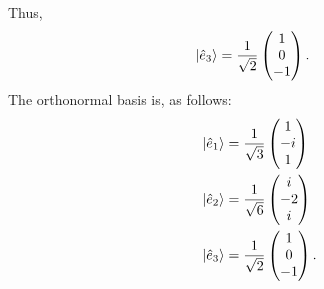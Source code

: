 \documentclass[10pt]{mypackage}
\begin{document}
\begin{example}
 Thus,
 \begin{align*}
   \ket{\hat{e}_3} &= \frac{1}{\sqrt{2}} \begin{pmatrix}1\\0\\-1\end{pmatrix}.
 \end{align*}
 The orthonormal basis is, as follows:
 \begin{align*}
   \ket{\hat{e}_1} &= \frac{1}{\sqrt{3}} \begin{pmatrix}1\\-i\\1\end{pmatrix}\\
   \ket{\hat{e}_2} &= \frac{1}{\sqrt{6}} \begin{pmatrix}i\\-2\\i\end{pmatrix}\\
   \ket{\hat{e}_3} &= \frac{1}{\sqrt{2}} \begin{pmatrix}1\\0\\-1\end{pmatrix}.
 \end{align*}
\end{example}
\end{document}
